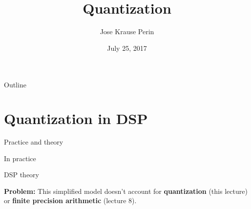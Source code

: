 \documentclass[10pt, aspectratio=169, handout]{beamer}
\title[EE 264]{Quantization}
\author{Jose Krause Perin}
\institute{Stanford University}
\date{July 25, 2017}
\begin{document}
\begin{frame}
  \titlepage
\end{frame}

%
\begin{frame}{Outline}
\tableofcontents
\end{frame}

%
\section{Quantization in DSP}
\begin{frame}{Practice and theory}
\begin{block}{In practice}
	\begin{center}
		\resizebox{0.9\linewidth}{!}{}
	\end{center}
\end{block}

\begin{block}{DSP theory}
	\begin{center}
		\resizebox{0.9\linewidth}{!}{}
	\end{center}

	\textbf{Problem:} This simplified model doesn't account for \textbf{quantization} (this lecture) or \textbf{finite precision arithmetic} (lecture 8).
\end{block}
\end{frame}
\end{document}

